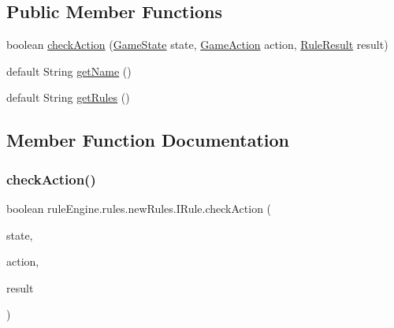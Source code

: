 \subsection*{Public Member Functions}
\begin{DoxyCompactItemize}
\item 
boolean \mbox{\hyperlink{interfacerule_engine_1_1rules_1_1new_rules_1_1_i_rule_a72ce29a47d7a5fba75a09444a50a481e}{check\+Action}} (\mbox{\hyperlink{classgame_1_1game_state_1_1_game_state}{Game\+State}} state, \mbox{\hyperlink{classrule_engine_1_1_game_action}{Game\+Action}} action, \mbox{\hyperlink{classrule_engine_1_1_rule_result}{Rule\+Result}} result)
\item 
default String \mbox{\hyperlink{interfacerule_engine_1_1rules_1_1new_rules_1_1_i_rule_a99e11d165ca863908c6e985a79917067}{get\+Name}} ()
\item 
default String \mbox{\hyperlink{interfacerule_engine_1_1rules_1_1new_rules_1_1_i_rule_a9d1c8d3f07b6ade794f60453449486c0}{get\+Rules}} ()
\end{DoxyCompactItemize}


\subsection{Member Function Documentation}
\mbox{\label{interfacerule_engine_1_1rules_1_1new_rules_1_1_i_rule_a72ce29a47d7a5fba75a09444a50a481e}} 
\subsubsection{\texorpdfstring{check\+Action()}{checkAction()}}
{\footnotesize\ttfamily boolean rule\+Engine.\+rules.\+new\+Rules.\+I\+Rule.\+check\+Action (\begin{DoxyParamCaption}\item[{\mbox{\hyperlink{classgame_1_1game_state_1_1_game_state}{Game\+State}}}]{state,  }\item[{\mbox{\hyperlink{classrule_engine_1_1_game_action}{Game\+Action}}}]{action,  }\item[{\mbox{\hyperlink{classrule_engine_1_1_rule_result}{Rule\+Result}}}]{result }\end{DoxyParamCaption})}



